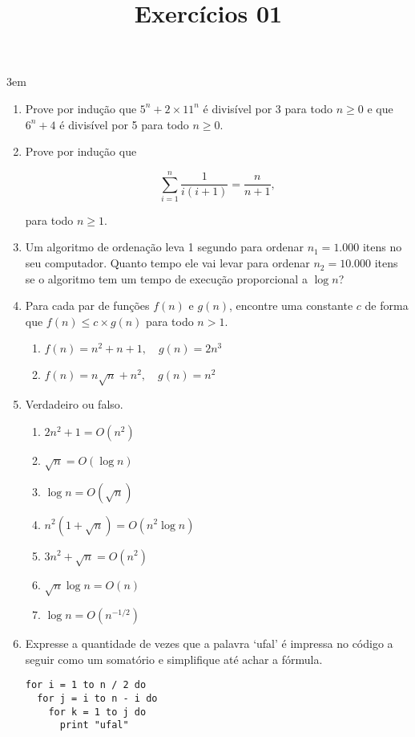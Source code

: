 \documentclass[a4paper,10pt]{article}
\title{Exercícios 01}
\begin{document}
\maketitle

\emergencystretch 3em

\begin{multicols*}{2}
\setlength{\leftmargini}{0pt}
\begin{enumerate}
  \item Prove por indução que $5^n + 2\times11^n$ é divisível por 3 para todo $n \geq 0$ e que $6^n + 4$ é divisível por 5 para todo $n \geq 0$.
  \item Prove por indução que

  \[
    \sum_{i = 1}^{n} \frac{1}{i(i+1)} = \frac{n}{n+1},
  \]

  para todo $n \geq 1$.

  \item Um algoritmo de ordenação leva 1 segundo para ordenar $n_1 = 1.000$ itens no seu computador. Quanto tempo ele vai levar para ordenar $n_2 = 10.000$ itens se o algoritmo tem um tempo de execução proporcional a $\log{n}$?
  \item Para cada par de funções $f(n)$ e $g(n)$, encontre uma constante $c$ de forma que $f(n) \leq c\times g(n)$ para todo $n > 1$.

  \begin{enumerate}
    \item $ f(n) = n^2+ n + 1, \quad g(n) = 2n^3 $
    \item $ f(n) = n \sqrt n + n^2, \quad g(n) = n^2 $
  \end{enumerate}

  \item Verdadeiro ou falso.

  \begin{enumerate}
    \item $ 2n^2 + 1 = O(n^2) $
    \item $ \sqrt{n} = O(\log{n}) $
    \item $ \log{n} = O(\sqrt{n}) $
    \item $ n^2(1+\sqrt{n}) = O(n^2\log{n}) $
    \item $ 3n^2+\sqrt{n} = O(n^2) $
    \item $ \sqrt{n}\log{n} = O(n) $
    \item $ \log{n} = O(n^{-1/2}) $
  \end{enumerate}

  \item Expresse a quantidade de vezes que a palavra `ufal' é impressa no código a seguir como um somatório e simplifique até achar a fórmula.

  \begin{verbatim}
for i = 1 to n / 2 do
  for j = i to n - i do
    for k = 1 to j do
      print "ufal"
  \end{verbatim}
\end{enumerate}
\end{multicols*}
\end{document}
